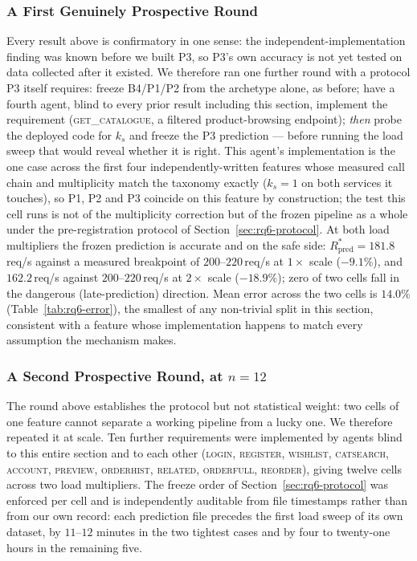 \documentclass[journal, 10pt]{IEEEtran}
\begin{document}
\subsubsection{A First Genuinely Prospective Round}
\label{sec:rq6-prospective}
Every result above is confirmatory in one sense: the independent-implementation
finding was known before we built P3, so P3's own accuracy is not yet tested
on data collected after it existed. We therefore ran one further round with a
protocol P3 itself requires: freeze B4/P1/P2 from the archetype alone, as
before; have a fourth agent, blind to every prior result including this
section, implement the requirement (\textsc{get\_catalogue}, a filtered
product-browsing endpoint); \emph{then} probe the deployed code for $k_s$ and
freeze the P3 prediction --- before running the load sweep that would reveal
whether it is right. This agent's implementation is the one case across the first
four independently-written features whose measured call chain and
multiplicity match the taxonomy exactly ($k_s=1$ on both services it touches),
so P1, P2 and P3 coincide on this feature by construction; the test this cell
runs is not of the multiplicity correction but of the frozen pipeline as a
whole under the pre-registration protocol of Section~\ref{sec:rq6-protocol}.
At both load multipliers the frozen prediction is accurate and on the safe
side: $R^{*}_{\text{pred}}=181.8\,$req/s against a measured breakpoint of
$200$--$220\,$req/s at $1\times$ scale ($-9.1\%$), and $162.2\,$req/s against
$200$--$220\,$req/s at $2\times$ scale ($-18.9\%$); zero of two cells fall in
the dangerous (late-prediction) direction. Mean error across the two cells is
$14.0\%$ (Table~\ref{tab:rq6-error}), the smallest of any non-trivial split in
this section, consistent with a feature whose implementation happens to match
every assumption the mechanism makes.

\subsubsection{A Second Prospective Round, at $n=12$}
\label{sec:rq6-prospective2}
The round above establishes the protocol but not statistical weight: two cells
of one feature cannot separate a working pipeline from a lucky one. We therefore
repeated it at scale. Ten further requirements were implemented by agents blind
to this entire section and to each other
(\textsc{login}, \textsc{register}, \textsc{wishlist}, \textsc{catsearch},
\textsc{account}, \textsc{preview}, \textsc{orderhist}, \textsc{related},
\textsc{orderfull}, \textsc{reorder}), giving twelve cells across two load
multipliers. The freeze order of Section~\ref{sec:rq6-protocol} was enforced per
cell and is independently auditable from file timestamps rather than from our
own record: each prediction file precedes the first load sweep of its own
dataset, by $11$--$12$ minutes in the two tightest cases and by four to
twenty-one hours in the remaining five.
\end{document}
